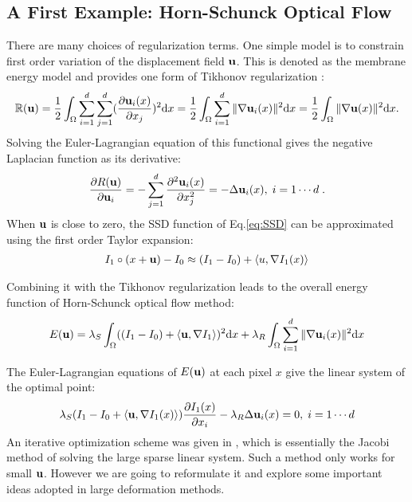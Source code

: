 \documentclass[letterpaper,12pt]{article}
\begin{document}
\subsection{A First Example: Horn-Schunck Optical Flow}
\label{sec:opticalflow}
There are many choices of regularization terms. One simple model is to
constrain first order variation of the displacement field $\mathbf{u}$. This
is denoted as the membrane energy model \cite{Ashburner2007} and
provides one form of Tikhonov regularization \cite{Horn1981}:
\begin{align}
\label{eq:membrane}
\mathbb{R}(\mathbf{u}) = \frac{1}{2} \int_\Omega \sum_{i=1}^d\sum_{j=1}^d (\frac{\partial \mathbf{u}_i(x)}{\partial x_j})^2 \text{d} x
= \frac{1}{2} \int_\Omega \sum_{i=1}^d \| \nabla \mathbf{u}_i(x) \|^2 \text{d} x = \frac{1}{2} \int_\Omega \| \nabla\mathbf{u}(x)\|^2 \text{d} x.
\end{align}
Solving the Euler-Lagrangian equation of this functional gives the negative Laplacian function as its derivative:
\begin{align}
\label{eq:membraneEL}
\frac{\partial R(\mathbf{u})}{\partial \mathbf{u}_i} = -  \sum_{j=1}^d \frac{\partial^2 \mathbf{u}_i(x)}{\partial x_j^2} 
= -  \Delta \mathbf{u}_i(x) 
, \; i=1 \cdots d \;.
\end{align}
When $\mathbf{u}$ is close to zero, the SSD function of Eq.\ref{eq:SSD} can be approximated using the first order Taylor expansion:
\begin{align}
I_1 \circ (x + \mathbf{u} ) - I_0 \approx (I_1 - I_0 ) + \langle u, \nabla I_1(x) \rangle
\label{eq:approxopticalflow}
\end{align}

Combining it with the Tikhonov regularization leads to the overall energy function of Horn-Schunck optical flow method: 
\begin{align}
E(\mathbf{u}) = \lambda_S \int_\Omega ((I_1 - I_0 ) + \langle \mathbf{u}, \nabla I_1 \rangle)^2 \text{d} x
+ \lambda_R \int_\Omega \sum_{i=1}^d \| \nabla \mathbf{u}_i(x) \|^2 \text{d} x
\end{align}

The Euler-Lagrangian equations of $E(\mathbf{u})$ at each pixel $x$ give the linear system of the optimal point:
\begin{align}
\lambda_S (I_1 - I_0  + \langle \mathbf{u}, \nabla I_1(x) \rangle) \frac{\partial I_1(x)}{\partial x_i}
- \lambda_R \Delta \mathbf{u}_i(x) = 0
, \; i=1 \cdots d
\label{eq:opticalflow}
\end{align}
An iterative optimization scheme was given in \cite{Horn1981}, which is essentially the Jacobi method of solving the large sparse linear system. Such a method only works for small $\mathbf{u}$. However we are going to reformulate it and explore some important ideas adopted in large deformation methods. 
\end{document}
